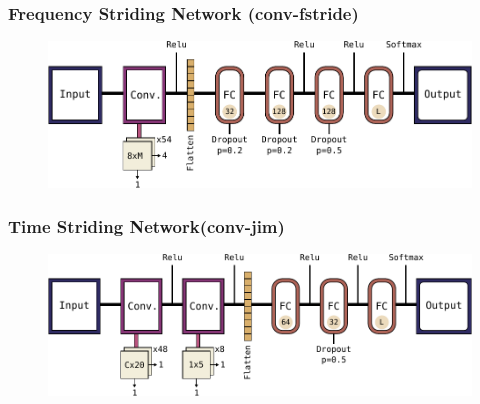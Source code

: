\begin{frame}
  \frametitle{Frequency Striding Network (conv-fstride)}
  \begin{figure} \includegraphics[width=1.0\textwidth]{../4_nn/figs/nn_arch_cnn_fstride.pdf} \end{figure}
\end{frame}

\begin{frame}
  \frametitle{Time Striding Network(conv-jim)}
  \begin{figure} \includegraphics[width=1.0\textwidth]{../4_nn/figs/nn_arch_cnn_jim.pdf} \end{figure}
\end{frame}

